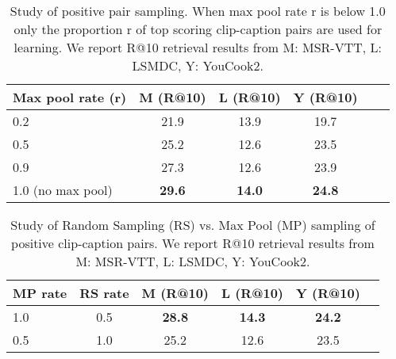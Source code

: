 \documentclass[10pt,twocolumn,letterpaper]{article}
\begin{document}
\begin{table}[t]
  \setlength{\tabcolsep}{3pt}
    \centering  
      \begin{tabular}{@{}lccccc@{}}
      \toprule
      Max pool rate (r) & M (R@10) & L (R@10) & Y (R@10)  \\
      \midrule
      0.2  & 21.9  & 13.9 & 19.7 \\
      0.5  & 25.2 & 12.6  & 23.5 \\
      0.9  & 27.3 & 12.6 & 23.9  \\
      1.0  (no max pool) &  \textbf{29.6} & \textbf{14.0} & \textbf{24.8} \\
      \bottomrule
    \end{tabular}
\vspace{-2mm}
 \caption{Study of positive pair sampling. When max pool rate r is below 1.0 only the proportion r of top scoring clip-caption pairs are used for learning.   We report R@10 retrieval results from M: MSR-VTT, L: LSMDC, Y: YouCook2.}
 \vspace{-4mm}
      \label{table:positive-sampling-experiment}
\end{table}

\begin{table}[t]
  \setlength{\tabcolsep}{3pt}
    \centering  
      \begin{tabular}{@{}lccccc@{}}
      \toprule
      MP rate & RS rate &M (R@10) & L (R@10) & Y (R@10)  \\
      \midrule
      1.0  & 0.5 & \textbf{28.8}  & \textbf{14.3} & \textbf{24.2} \\
      0.5  & 1.0 & 25.2 & 12.6  & 23.5 \\
      \bottomrule
    \end{tabular}
\vspace{-2mm}
 \caption{Study of Random Sampling (RS) vs. Max Pool (MP) sampling of positive clip-caption pairs. We report R@10 retrieval results from M: MSR-VTT, L: LSMDC, Y: YouCook2.}
 \vspace{-4mm}
      \label{table:positive-sampling-check}
\end{table}
\end{document}
